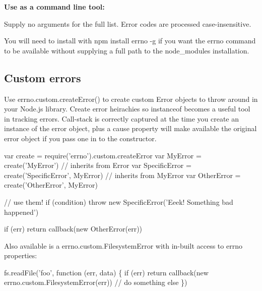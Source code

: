 {\bfseries Use as a command line tool\+:}




Supply no arguments for the full list. Error codes are processed case-\/insensitive.

You will need to install with {\ttfamily npm install errno -\/g} if you want the {\ttfamily errno} command to be available without supplying a full path to the node\+\_\+modules installation.

\label{_customerrors}%
 \subsection*{Custom errors}

Use {\ttfamily errno.\+custom.\+create\+Error()} to create custom {\ttfamily Error} objects to throw around in your Node.\+js library. Create error heirachies so {\ttfamily instanceof} becomes a useful tool in tracking errors. Call-\/stack is correctly captured at the time you create an instance of the error object, plus a {\ttfamily cause} property will make available the original error object if you pass one in to the constructor.


\begin{DoxyCode}
var create = require('errno').custom.createError
var MyError = create('MyError') // inherits from Error
var SpecificError = create('SpecificError', MyError) // inherits from MyError
var OtherError = create('OtherError', MyError)

// use them!
if (condition) throw new SpecificError('Eeek! Something bad happened')

if (err) return callback(new OtherError(err))
\end{DoxyCode}


Also available is a {\ttfamily errno.\+custom.\+Filesystem\+Error} with in-\/built access to errno properties\+:


\begin{DoxyCode}
fs.readFile('foo', function (err, data) \{
  if (err) return callback(new errno.custom.FilesystemError(err))
  // do something else
\})
\end{DoxyCode}


